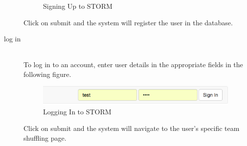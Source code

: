 \begin{description}
\begin{figure}[H]
		 \caption{Signing Up to STORM}
		 \end{figure}
   		Click on submit and the system will register the user in the database.
	\item[log in] \hfill \\
 		To log in to an account, enter user details in the appropriate fields in the following figure.\par
   		\begin{figure}[H] 
		\centering 
		\includegraphics[width=10cm]{./graphics/StormUMSU2.jpg}
		\caption{Logging In to STORM}
		\end{figure}
   		Click on submit and the system will navigate to the user's specific team shuffling page.
				
\end{description}